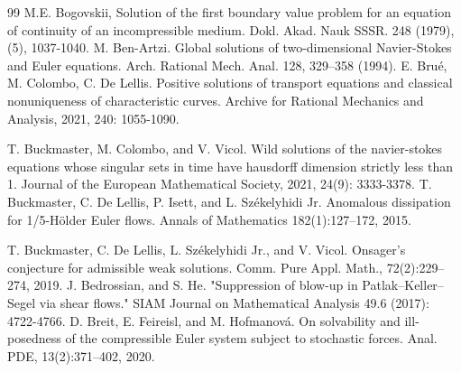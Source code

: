 \documentclass[UTF-8,reqno]{amsart}
\numberwithin{equation}{section}
\theoremstyle{definition}
\begin{document}
\begin{thebibliography}{99}
M.E. Bogovskii, Solution of the first boundary value problem for an equation of continuity of an incompressible medium. Dokl. Akad. Nauk SSSR. 248 (1979), (5), 1037-1040.
M. Ben-Artzi. Global solutions of two-dimensional Navier-Stokes and Euler equations.
Arch. Rational Mech. Anal. 128, 329–358 (1994).
E. Bru\'e, M. Colombo, C. De Lellis. Positive solutions of transport equations and classical nonuniqueness of characteristic curves. Archive for Rational Mechanics and Analysis, 2021, 240: 1055-1090.
 
T. Buckmaster, M. Colombo, and V. Vicol. Wild solutions of the navier-stokes equations whose singular sets in time have hausdorff dimension strictly less than 1. Journal of the European Mathematical Society, 2021, 24(9): 3333-3378.
 T. Buckmaster, C. De Lellis, P. Isett, and L. Sz{\'e}kelyhidi Jr.  Anomalous dissipation for 1/5-H\"older Euler flows. Annals of Mathematics  182(1):127–172, 2015.

T. Buckmaster, C. De Lellis, L. Sz\'{e}kelyhidi Jr., and V. Vicol. Onsager’s conjecture for admissible weak
solutions. Comm. Pure Appl. Math., 72(2):229–274, 2019.
J. Bedrossian, and S. He. "Suppression of blow-up in Patlak--Keller--Segel via shear flows." SIAM Journal on Mathematical Analysis 49.6 (2017): 4722-4766.
D. Breit, E. Feireisl, and M. Hofmanov\'a. On solvability and ill-posedness of the compressible Euler system subject to stochastic forces. Anal. PDE, 13(2):371–402, 2020.


\end{thebibliography}
\end{document}
